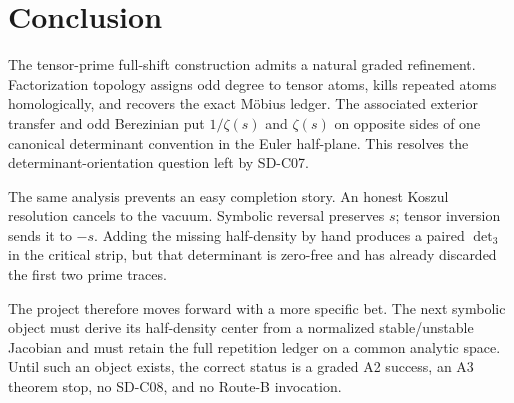 \section{Conclusion}

The tensor-prime full-shift construction admits a natural graded refinement.
Factorization topology assigns odd degree to tensor atoms, kills repeated
atoms homologically, and recovers the exact M\"obius ledger. The associated
exterior transfer and odd Berezinian put $1/\zeta(s)$ and $\zeta(s)$ on
opposite sides of one canonical determinant convention in the Euler
half-plane. This resolves the determinant-orientation question left by
SD-C07.

The same analysis prevents an easy completion story. An honest Koszul
resolution cancels to the vacuum. Symbolic reversal preserves $s$; tensor
inversion sends it to $-s$. Adding the missing half-density by hand produces
a paired $\det_3$ in the critical strip, but that determinant is zero-free
and has already discarded the first two prime traces.

The project therefore moves forward with a more specific bet. The next
symbolic object must derive its half-density center from a normalized
stable/unstable Jacobian and must retain the full repetition ledger on a
common analytic space. Until such an object exists, the correct status is a
graded A2 success, an A3 theorem stop, no SD-C08, and no Route-B invocation.
